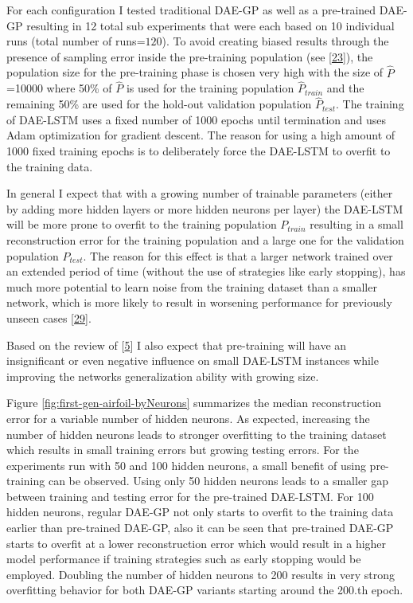 \documentclass[
  11pt,
]{article}
\begin{document}
For each configuration I tested traditional DAE-GP as well as a pre-trained DAE-GP resulting in 12 total sub experiments that were each based on 10 individual runs (total number of runs=\(120\)). To avoid creating biased results through the presence of sampling error inside the pre-training population (see {[}\protect\hyperlink{ref-sampling_err_gp}{23}{]}), the population size for the pre-training phase is chosen very high with the size of \(\hat{P}\) =10000 where 50\% of \(\hat{P}\) is used for the training population \(\hat{P}_{train}\) and the remaining 50\% are used for the hold-out validation population \(\hat{P}_{test}\). The training of DAE-LSTM uses a fixed number of 1000 epochs until termination and uses Adam optimization for gradient descent. The reason for using a high amount of 1000 fixed training epochs is to deliberately force the DAE-LSTM to overfit to the training data.

In general I expect that with a growing number of trainable parameters (either by adding more hidden layers or more hidden neurons per layer) the DAE-LSTM will be more prone to overfit to the training population \(P_{train}\) resulting in a small reconstruction error for the training population and a large one for the validation population \(P_{test}\). The reason for this effect is that a larger network trained over an extended period of time (without the use of strategies like early stopping), has much more potential to learn noise from the training dataset than a smaller network, which is more likely to result in worsening performance for previously unseen cases {[}\protect\hyperlink{ref-weigend1994overfitting}{29}{]}.

Based on the review of {[}\protect\hyperlink{ref-pmlr-v5-erhan09a}{5}{]} I also expect that pre-training will have an insignificant or even negative influence on small DAE-LSTM instances while improving the networks generalization ability with growing size.

Figure \ref{fig:first-gen-airfoil-byNeurons} summarizes the median reconstruction error for a variable number of hidden neurons. As expected, increasing the number of hidden neurons leads to stronger overfitting to the training dataset which results in small training errors but growing testing errors. For the experiments run with 50 and 100 hidden neurons, a small benefit of using pre-training can be observed. Using only 50 hidden neurons leads to a smaller gap between training and testing error for the pre-trained DAE-LSTM. For 100 hidden neurons, regular DAE-GP not only starts to overfit to the training data earlier than pre-trained DAE-GP, also it can be seen that pre-trained DAE-GP starts to overfit at a lower reconstruction error which would result in a higher model performance if training strategies such as early stopping would be employed. Doubling the number of hidden neurons to 200 results in very strong overfitting behavior for both DAE-GP variants starting around the 200.th epoch.
\end{document}
